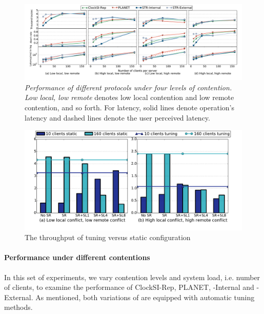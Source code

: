\begin{figure}
\centering
\def\svgwidth{0.98\columnwidth}
\includegraphics[scale=0.35]{figures/micro}
\hspace{-10mm}
\caption{\textit{Performance of different protocols under four levels of contention.} \textit{Low local, low remote} denotes low local contention and low remote contention, and so forth. For latency, solid lines denote operation's latency and dashed lines denote the user perceived latency.}
\label{fig:micro_conflict}
\end{figure}


\begin{figure}[t]
\centering
\def\svgwidth{0.98\columnwidth}
\includegraphics[scale = 0.28]{figures/tuning}
\vspace{-7mm}
\caption{\footnotesize The throughput of tuning versus static configuration}
\label{fig:tuning}
\end{figure}

\paragraph{Performance under different contentions} In this set of experiments, we vary contention levels and system load, i.e. number of clients, to examine the performance of ClockSI-Rep, PLANET, {\specula}-Internal and {\specula}-External. As mentioned, both variations of {\specula} are equipped with automatic tuning methods. 


